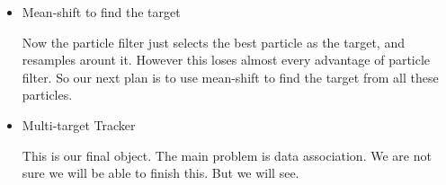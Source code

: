 \documentclass[a4paper]{article}
\begin{document}
\begin{enumerate}
\begin{itemize}
\item Mean-shift to find the target

Now the particle filter just selects the best particle as the target, and resamples arount it. However this loses almost every advantage of particle filter. So our next plan is to use mean-shift to find the target from all these particles.

\item Multi-target Tracker

This is our final object. The main problem is data association. We are not sure we will be able to finish this. But we will see.

\end{itemize}

\end{enumerate}

\clearpage


\end{document}

